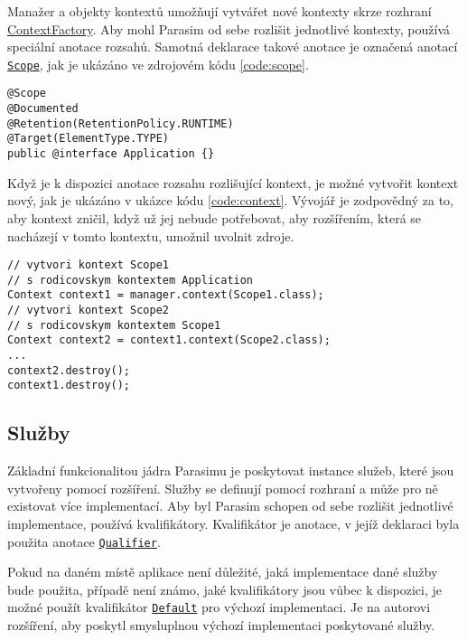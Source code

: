 Manažer a objekty kontextů umožňují vytvářet nové kontexty skrze rozhraní \href{https://github.com/sybila/parasim/blob/2.0.0.Final/core/src/main/java/org/sybila/parasim/core/api/ContextFactory.java}{ContextFactory}.
Aby mohl Parasim od se\-be rozlišit jednotlivé kontexty, používá speciální anotace
rozsahů. Samotná deklarace takové anotace je označená anotací \href{https://github.com/sybila/parasim/blob/2.0.0.Final/core/src/main/java/org/sybila/parasim/core/annotation/Scope.java}{\texttt{Scope}},
jak je ukázáno ve zdrojovém kódu \ref{code:scope}.

\begin{lstlisting}[label={code:scope}, caption={Anotace rozsahu}, style=Java]
@Scope
@Documented
@Retention(RetentionPolicy.RUNTIME)
@Target(ElementType.TYPE)
public @interface Application {}
\end{lstlisting}

Když je k dispozici anotace rozsahu rozlišující kontext, je možné  vytvořit kontext
nový, jak je ukázáno v ukázce kódu \ref{code:context}. Vývojář je zodpovědný za to,
aby kontext zničil, když už jej nebude potřebovat, aby roz\-ší\-ře\-ním, která se nacházejí
v tomto kontextu, umožnil uvolnit zdroje.

\begin{lstlisting}[label={code:context}, caption={Vytvoření kontextu}, style=Java]
// vytvori kontext Scope1
// s rodicovskym kontextem Application
Context context1 = manager.context(Scope1.class); 
// vytvori kontext Scope2
// s rodicovskym kontextem Scope1
Context context2 = context1.context(Scope2.class);
...
context2.destroy();
context1.destroy();
\end{lstlisting}

\subsection{Služby}

Základní funkcionalitou jádra Parasimu je poskytovat instance služeb, které jsou
vytvořeny pomocí rozšíření. Služby se definují pomocí rozhraní a může pro ně existovat
více implementací. Aby byl Parasim schopen od sebe rozlišit jednotlivé implementace,
používá kvalifikátory. Kva\-li\-fi\-ká\-tor je anotace, v jejíž deklaraci byla použita anotace
\href{https://github.com/sybila/parasim/blob/2.0.0.Final/core/src/main/java/org/sybila/parasim/core/annotation/Qualifier.java}{\texttt{Qualifier}}.

Pokud na daném místě aplikace není důležité, jaká implementace dané služby bude použita,
případě není známo, jaké kvalifikátory jsou vůbec k dispozici, je možné použít kvalifikátor
\href{https://github.com/sybila/parasim/blob/2.0.0.Final/core/src/main/java/org/sybila/parasim/core/annotation/Default.java}{\texttt{Default}}
pro výchozí implementaci. Je na autorovi rozšíření, aby poskytl smysluplnou výchozí implementaci
poskytované služby.

